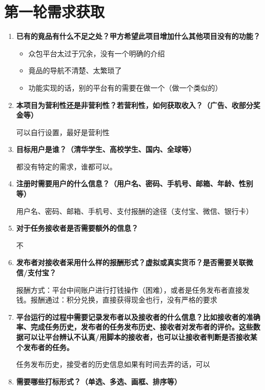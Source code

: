 \section{第一轮需求获取}

\begin{enumerate}
    \item \textbf{已有的竟品有什么不足之处？甲方希望此项目增加什么其他项目没有的功能？}
    \begin{itemize}
        \item 众包平台太过于冗余，没有一个明确的介绍
        \item 竟品的导航不清楚、太繁琐了
        \item 功能实现的话，别的平台有的需要在做一个（做一个类似的）
    \end{itemize}
    \item \textbf{本项目为营利性还是非营利性？若营利性，如何获取收入？（广告、收部分奖金等）}
    
    可以自行设置，最好是营利性

    \item \textbf{目标用户是谁？（清华学生、高校学生、国内、全球等）}

    都没有特定的需求，谁都可以。

    \item \textbf{注册时需要用户的什么信息？（用户名、密码、手机号、邮箱、年龄、性别等）}
    
    用户名、密码、邮箱、手机号、支付报酬的途径（支付宝、微信、银行卡）

    \item \textbf{对于任务接收者是否需要额外的信息？}
    
    不
    
    \item \textbf{发布者对接收者采用什么样的报酬形式？虚拟或真实货币？是否需要关联微信/支付宝？}
    
    报酬方式：平台中间账户进行打钱操作（困难），或者是任务发布者直接发钱。报酬通过：积分兑换，直接获得现金也行，没有严格的要求
    
    \item \textbf{平台运行的过程中需要记录发布者以及接收者的什么信息？比如接收者的准确率、完成任务历史，发布者的任务发布历史、接收者对发布者的评价。这些数据可以让平台辨认不认真/用脚本的接收者，也可以让接收者判断是否接收某个发布者的任务。}
    
    任务发布历史，接受者的历史信息如果有时间去弄的话，可以

    \item \textbf{需要哪些打标形式？（单选、多选、画框、排序等）}
    

\end{enumerate}
